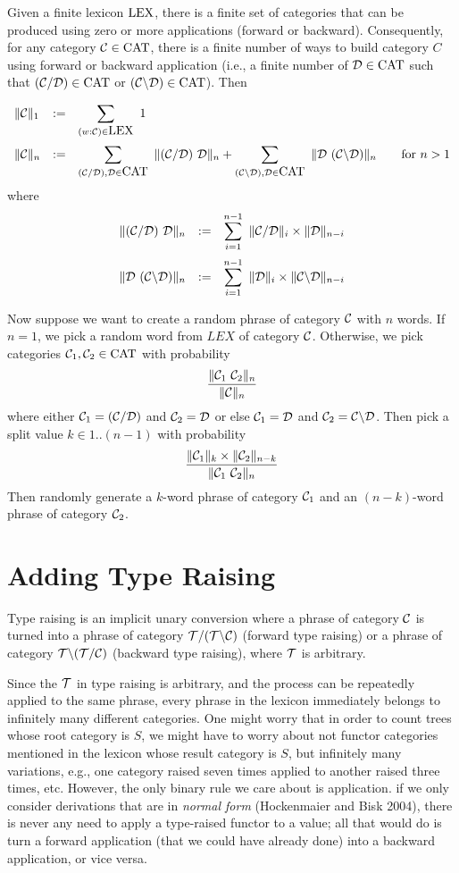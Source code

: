 \documentclass[10pt]{article}
\begin{document}
Given a finite lexicon $\mbox{LEX}$, there is a finite set \CAT{} of categories that can be produced using zero or more applications (forward or backward). Consequently,
for any category \({\cal C} \in \mbox{CAT}\), there is a finite number of ways to build
category $C$ using forward or backward application (i.e., a finite number
of \({\cal D}\in\mbox{CAT}\) such that \(({\cal C}/{\cal D})\in\mbox{CAT}\) or \(({\cal C}\backslash {\cal D})\in\mbox{CAT}\)). Then

\[
    \begin{array}{lcl}
    \|\C\|_1 &:=& \displaystyle\sum_{(w{:}\C)\in \LEX}\  1\\
    \noalign{\medskip}
    \|\C\|_n &:=& \displaystyle\sum_{(\C/\D),\D\in\CAT}\  \|(\C/\D)\ \D\|_n +
    \sum_{(\C\backslash\D),\D\in\CAT}\ \| \D\ (\C\backslash \D)\|_n\qquad\mbox{for $n>1$}
    \end{array}
\]
where
\[
    \begin{array}{lcl}
    \|(\C/\D)\ \D\|_n &:=& \displaystyle\sum_{i=1}^{n-1}\ \|\C/\D\|_i\times\|\D\|_{n-i}\\
    \noalign{\medskip}
    \|\D\ (\C\backslash \D)\|_n &:=& \displaystyle\sum_{i=1}^{n-1}\ \|\D\|_i\times\|\C\backslash \D\|_{n-i}

\end{array}
\]

Now suppose we want to create a random phrase of category ${\cal C}$ with $n$ words.
If $n = 1$, we pick a random word from $LEX$ of category  ${\cal C}$. Otherwise, we pick categories \({\cal C}_1,{\cal C}_2\in\mbox{CAT}\) with probability
\[
\frac{\|\C_1\ \C_2\|_n}{\|\C\|_n}
\]
where either ${\cal C}_1 = ({\cal C}/{\cal D})$ and ${\cal C}_2 = {\cal D}$ or else \({\cal C}_1={\cal D}\) and \({\cal C}_2= {\cal C}\backslash{\cal D}\). Then pick a split value $k\in 1..(n-1)$ with probability
\[
    \frac{\|\C_1\|_k\times\|\C_2\|_{n{-}k}}{\|\C_1\ \C_2\|_n}
  \]
  Then randomly generate a $k$-word phrase of category \({\cal C}_1\) and an \((n{-}k)\)-word phrase of category \({\cal C}_2\).


\section{Adding Type Raising}
\label{sect:typeraising}

Type raising is an implicit unary conversion where a phrase of category ${\cal C}$ is turned into a phrase of category ${\cal T} / ({\cal T} \backslash {\cal C})$ (forward type raising) or a phrase of category ${\cal T} \backslash ({\cal T} / {\cal C})$ (backward type raising), where ${\cal T}$ is arbitrary.

Since the ${\cal T}$ in type raising is arbitrary, and the process can be repeatedly applied to the same phrase, every phrase in the lexicon immediately belongs to infinitely many different categories. One might worry that in order to count trees whose root category is $S$, we might have to worry about not functor categories mentioned in the lexicon whose result category is $S$, but infinitely many variations, e.g., one category raised seven times applied to another raised three times, etc.  However, the only binary rule we care about is application. if we only consider derivations that are in \emph{normal form} (Hockenmaier and Bisk 2004), there is never any need to apply a type-raised functor to a value; all that would do is turn a forward application (that we could have already done) into a backward application, or vice versa.
\end{document}
